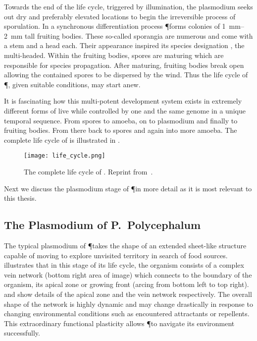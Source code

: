 		Towards the end of the life cycle, triggered by illumination, the plasmodium seeks out dry and preferably elevated locations to begin the irreversible process of sporulation. In a synchronous differentiation process \P forms colonies of \SIrange{1}{2}{\milli\metre} tall fruiting bodies. These so-called sporangia are numerous and come with a stem and a head each. Their appearance inspired its species designation \Pp, the multi-headed. Within the fruiting bodies, spores are maturing which are responsible for species propagation. After maturing, fruiting bodies break open allowing the contained spores to be dispersed by the wind. Thus the life cycle of \P, given suitable conditions, may start anew.

		It is fascinating how this multi-potent development system exists in extremely different forms of live while controlled by one and the same genome in a unique temporal sequence. From spores to amoeba, on to plasmodium and finally to fruiting bodies. From there back to spores and again into more amoeba. The complete life cycle of \Pp is illustrated in .

		\begin{figure}[htb]
			\centering
			\texttt{[image: life\_cycle.png]}
			\caption[Life cycle of \P]{The complete life cycle of \Pp. Reprint from~\cite{Sauer1986}.}
			\label{fig:life_cycle}
		\end{figure}

		Next we discuss the plasmodium stage of \P in more detail as it is most relevant to this thesis.

		\FloatBarrier

	\subsection{The Plasmodium of P.~Polycephalum}

		The typical plasmodium of \P takes the shape of an extended sheet-like structure capable of moving to explore unvisited territory in search of food sources.  illustrates that in this stage of its life cycle, the organism consists of a complex vein network (bottom right area of image) which connects to the boundary of the organism, its apical zone or growing front (arcing from bottom left to top right).  and  show details of the apical zone and the vein network respectively. The overall shape of the network is highly dynamic and may change drastically in response to changing environmental conditions such as encountered attractants or repellents. This extraordinary functional plasticity allows \P to navigate its environment successfully.

